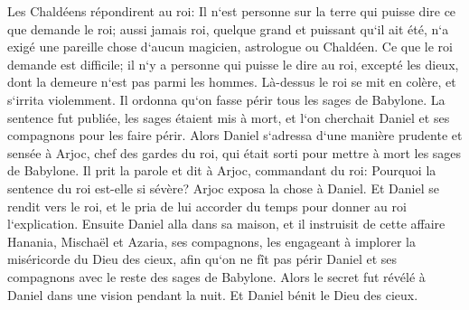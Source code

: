 \verse Les Chaldéens répondirent au roi: Il n`est personne sur la terre qui puisse dire ce que demande le roi; aussi jamais roi, quelque grand et puissant qu`il ait été, n`a exigé une pareille chose d`aucun magicien, astrologue ou Chaldéen. 
\verse Ce que le roi demande est difficile; il n`y a personne qui puisse le dire au roi, excepté les dieux, dont la demeure n`est pas parmi les hommes. 
\verse Là-dessus le roi se mit en colère, et s`irrita violemment. Il ordonna qu`on fasse périr tous les sages de Babylone. 
\verse La sentence fut publiée, les sages étaient mis à mort, et l`on cherchait Daniel et ses compagnons pour les faire périr. 
\verse Alors Daniel s`adressa d`une manière prudente et sensée à Arjoc, chef des gardes du roi, qui était sorti pour mettre à mort les sages de Babylone. 
\verse Il prit la parole et dit à Arjoc, commandant du roi: Pourquoi la sentence du roi est-elle si sévère? Arjoc exposa la chose à Daniel. 
\verse Et Daniel se rendit vers le roi, et le pria de lui accorder du temps pour donner au roi l`explication. 
\verse Ensuite Daniel alla dans sa maison, et il instruisit de cette affaire Hanania, Mischaël et Azaria, ses compagnons, 
\verse les engageant à implorer la miséricorde du Dieu des cieux, afin qu`on ne fît pas périr Daniel et ses compagnons avec le reste des sages de Babylone. 
\verse Alors le secret fut révélé à Daniel dans une vision pendant la nuit. Et Daniel bénit le Dieu des cieux. 
